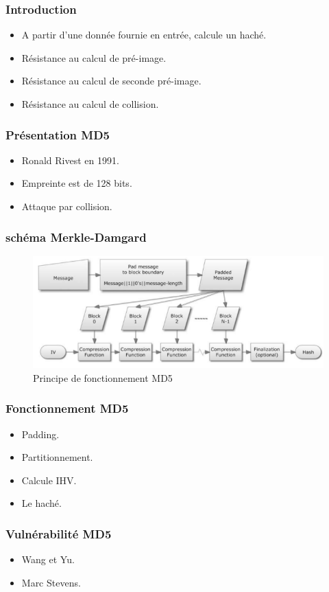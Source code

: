 \begin{frame}
\frametitle{Introduction}


\begin{itemize}
\item A partir d'une donnée fournie en entrée, calcule un haché.\\
\item Résistance au calcul de pré-image.
\item Résistance au calcul de seconde pré-image.
\item Résistance au calcul de collision.\\
\end{itemize}
\end{frame}

\begin{frame}
\frametitle{Présentation MD5}

\begin{itemize}
\item Ronald Rivest en 1991.\\
\item Empreinte est de 128 bits.\\
\item Attaque par collision.
\end{itemize}
\end{frame}

\begin{frame}
\frametitle{schéma Merkle-Damgard}
\begin{figure}[h!]
\center
 \includegraphics[width=11.5cm]{images/md.png}
 
  \caption{Principe de fonctionnement MD5}
\end{figure}
\end{frame}

\begin{frame}
\frametitle{Fonctionnement MD5}


\begin{itemize}
\item Padding.\\
\item Partitionnement.\\
\item Calcule IHV.\\
\item Le haché.\\

\end{itemize}
\end{frame}


\begin{frame}
\frametitle{Vulnérabilité MD5}

\begin{itemize}
\item Wang et Yu.\\
\item Marc Stevens.\\
\end{itemize}
\end{frame}